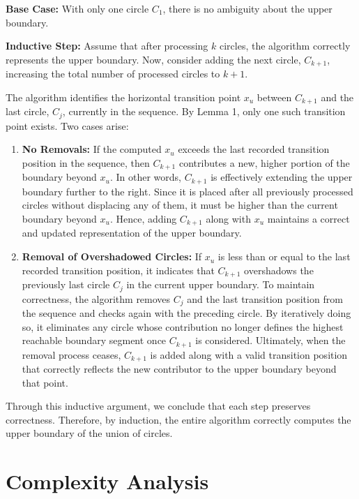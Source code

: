 \documentclass[12pt]{article}
\begin{document}
\textbf{Base Case:} With only one circle $C_1$, there is no ambiguity about the upper
boundary.

\textbf{Inductive Step:} Assume that after processing $k$ circles, the algorithm correctly
represents the upper boundary. Now, consider adding the next circle, $C_{k+1}$, increasing the
total number of processed circles to $k + 1$.

The algorithm identifies the horizontal transition point $x_u$ between $C_{k+1}$ and the
last circle, $C_j$, currently in the sequence. By Lemma 1, only one such transition point
exists. Two cases arise:

\begin{enumerate}
    \item \textbf{No Removals:} If the computed $x_u$ exceeds the last recorded transition position in
    the sequence, then $C_{k+1}$ contributes a new, higher portion of the boundary beyond
    $x_u$. In other words, $C_{k+1}$ is effectively extending the upper boundary further to the
    right. Since it is placed after all previously processed circles without displacing
    any of them, it must be higher than the current boundary beyond $x_u$. Hence,
    adding $C_{k+1}$ along with $x_u$ maintains a correct and updated representation of the
    upper boundary.

    \item \textbf{Removal of Overshadowed Circles:} If $x_u$ is less than or equal to the last
    recorded transition position, it indicates that $C_{k+1}$ overshadows the previously last
    circle $C_j$ in the current upper boundary. To maintain correctness, the algorithm
    removes $C_j$ and the last transition position from the sequence and checks again
    with the preceding circle. By iteratively doing so, it eliminates any circle whose
    contribution no longer defines the highest reachable boundary segment once $C_{k+1}$
    is considered. Ultimately, when the removal process ceases, $C_{k+1}$ is added along
    with a valid transition position that correctly reflects the new contributor to the
    upper boundary beyond that point.
\end{enumerate}

Through this inductive argument, we conclude that each step preserves
correctness. Therefore, by induction, the entire algorithm correctly computes the upper
boundary of the union of circles.

\section{Complexity Analysis}
\end{document}
